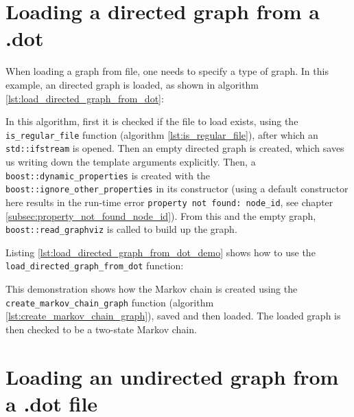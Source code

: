 \section{Loading a directed graph from a .dot}
\label{subsec:load_directed_graph_from_dot}

When loading a graph from file, one needs to specify a type of graph.
In this example, an directed graph is loaded, as shown in algorithm 
\ref{lst:load_directed_graph_from_dot}:



In this algorithm, first it is checked if the file to load exists, 
using the \verb;is_regular_file; function (algorithm \ref{lst:is_regular_file}), 
after which an \verb;std::ifstream; 
is opened.
Then an empty directed graph is created, which saves us writing down the
template arguments explicitly.
Then, a \verb;boost::dynamic_properties; 
is created with the 
\verb;boost::ignore_other_properties; 
in its constructor (using a default constructor here results in the run-time
error 
\verb;property not found: node_id;, see chapter \ref{subsec:property_not_found_node_id}).
From this and the empty graph, 
\verb;boost::read_graphviz; 
is called to build up the graph.

Listing \ref{lst:load_directed_graph_from_dot_demo}
shows how to use the \verb;load_directed_graph_from_dot; function:



This demonstration shows how the Markov chain is created using the 
\verb;create_markov_chain_graph; function 
(algorithm \ref{lst:create_markov_chain_graph}), 
saved and then loaded.
The loaded graph is then checked to be a two-state Markov chain.

\section{Loading an undirected graph from a .dot file}
\label{subsec:load_undirected_graph_from_dot}

